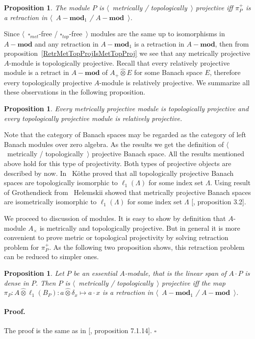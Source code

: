 \documentclass[12pt]{article}
\newcommand{\projtens}{\mathbin{\widehat{\otimes}}}
\newtheorem{proposition}[theorem]{Proposition}
\renewenvironment{proof}{\paragraph{Proof.}}{\hfill$\square$\medskip}
\begin{document}
\begin{proposition}\label{MetTopProjModViaCanonicMorph} The module $P$ is
    $\langle$~metrically / topologically~$\rangle$ projective iff $\pi_P^+$ is a
    retraction in $\langle$~$A-\mathbf{mod}_1$ / $A-\mathbf{mod}$~$\rangle$.
\end{proposition}

Since $\langle$~$\square_{met}$-free / $\square_{top}$-free~$\rangle$ modules
are the same up to isomorphisms in $A-\mathbf{mod}$ and any retraction 
in $A-\mathbf{mod}_1$ is a retraction in $A-\mathbf{mod}$, 
then from proposition~\ref{RetrMetTopProjIsMetTopProj}
we see that any metrically projective $A$-module is topologically projective.
Recall that every relatively projective module is a 
retract in $A-\mathbf{mod}$ of $A_+\projtens E$ for 
some Banach space $E$, therefore every topologically
projective $A$-module is relatively projective. We summarize all these
observations in the following proposition.

\begin{proposition}\label{MetProjIsTopProjAndTopProjIsRelProj} Every metrically
    projective module is topologically projective and every topologically
    projective module is relatively projective.
\end{proposition}

Note that the category of Banach spaces may be regarded as the category of left
Banach modules over zero algebra. As the results we get the definition of
$\langle$~metrically / topologically~$\rangle$ projective Banach space. All the
results mentioned above hold for this type of projectivity. Both types of
projective objects are described by now. In~\cite{KotheTopProjBanSp} K{\"o}the
proved that all topologically projective Banach spaces are topologically
isomorphic to $\ell_1(\Lambda)$ for some index set $\Lambda$. Using result of
Grothendieck from~\cite{GrothMetrProjFlatBanSp} Helemskii showed that metrically
projective Banach spaces are isometrically isomorphic to $\ell_1(\Lambda)$ for
some index set $\Lambda$ [\cite{HelMetrFrQMod}, proposition 3.2].

We proceed to discussion of modules. It is easy to show by definition that
$A$-module $A_\times$ is metrically and topologically projective. But in general
it is more convenient to prove metric or topological projectivity by solving
retraction problem for $\pi_P^+$. As the following two proposition shows, this
retraction problem can be reduced to simpler ones.

\begin{proposition}\label{NonDegenMetTopProjCharac}  Let $P$ be an essential
    $A$-module, that is the linear span of $A\cdot P$ is dense in $P$. Then $P$
    is $\langle$~metrically / topologically~$\rangle$ projective iff the map
    $\pi_P:A\projtens\ell_1(B_P):a\projtens\delta_x\mapsto a\cdot x$ is a
    retraction in $\langle$~$A-\mathbf{mod}_1$ / $A-\mathbf{mod}$~$\rangle$.
\end{proposition}
\begin{proof} The proof is the same as in [\cite{HelBanLocConvAlg}, proposition
            7.1.14].
\end{proof}
\end{document}
